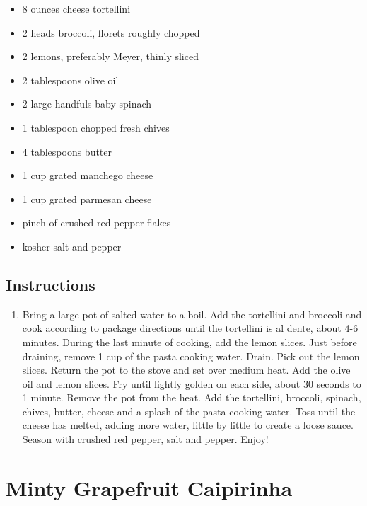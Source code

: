 \documentclass[
  letterpaper,
  DIV=11,
  numbers=noendperiod,
  titlepage=false]{scrreprt}
\providecommand{\tightlist}{%
  \setlength{\itemsep}{0pt}\setlength{\parskip}{0pt}}\usepackage{longtable,booktabs,array}
\begin{document}
\begin{itemize}
\tightlist
\item
  8 ounces cheese tortellini
\item
  2 heads broccoli, florets roughly chopped
\item
  2 lemons, preferably Meyer, thinly sliced
\item
  2 tablespoons olive oil
\item
  2 large handfuls baby spinach
\item
  1 tablespoon chopped fresh chives
\item
  4 tablespoons butter
\item
  1 cup grated manchego cheese
\item
  1 cup grated parmesan cheese
\item
  pinch of crushed red pepper flakes
\item
  kosher salt and pepper
\end{itemize}

\section{Instructions}\label{instructions-132}

\begin{enumerate}
\def\labelenumi{\arabic{enumi}.}
\tightlist
\item
  Bring a large pot of salted water to a boil. Add the tortellini and
  broccoli and cook according to package directions until the tortellini
  is al dente, about 4-6 minutes. During the last minute of cooking, add
  the lemon slices. Just before draining, remove 1 cup of the pasta
  cooking water. Drain. Pick out the lemon slices. Return the pot to the
  stove and set over medium heat. Add the olive oil and lemon slices.
  Fry until lightly golden on each side, about 30 seconds to 1 minute.
  Remove the pot from the heat. Add the tortellini, broccoli, spinach,
  chives, butter, cheese and a splash of the pasta cooking water. Toss
  until the cheese has melted, adding more water, little by little to
  create a loose sauce. Season with crushed red pepper, salt and pepper.
  Enjoy!
\end{enumerate}


\chapter{Minty Grapefruit Caipirinha}\label{minty-grapefruit-caipirinha}
\end{document}
